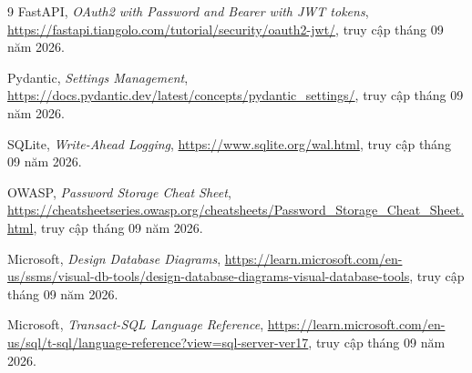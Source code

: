 \begin{thebibliography}{9}
FastAPI, \textit{OAuth2 with Password and Bearer with JWT tokens},
\url{https://fastapi.tiangolo.com/tutorial/security/oauth2-jwt/},
truy cập tháng 09 năm 2026.

Pydantic, \textit{Settings Management},
\url{https://docs.pydantic.dev/latest/concepts/pydantic_settings/},
truy cập tháng 09 năm 2026.

SQLite, \textit{Write-Ahead Logging},
\url{https://www.sqlite.org/wal.html},
truy cập tháng 09 năm 2026.

OWASP, \textit{Password Storage Cheat Sheet},
\url{https://cheatsheetseries.owasp.org/cheatsheets/Password_Storage_Cheat_Sheet.html},
truy cập tháng 09 năm 2026.

Microsoft, \textit{Design Database Diagrams},
\url{https://learn.microsoft.com/en-us/ssms/visual-db-tools/design-database-diagrams-visual-database-tools},
truy cập tháng 09 năm 2026.

Microsoft, \textit{Transact-SQL Language Reference},
\url{https://learn.microsoft.com/en-us/sql/t-sql/language-reference?view=sql-server-ver17},
truy cập tháng 09 năm 2026.
\end{thebibliography}
